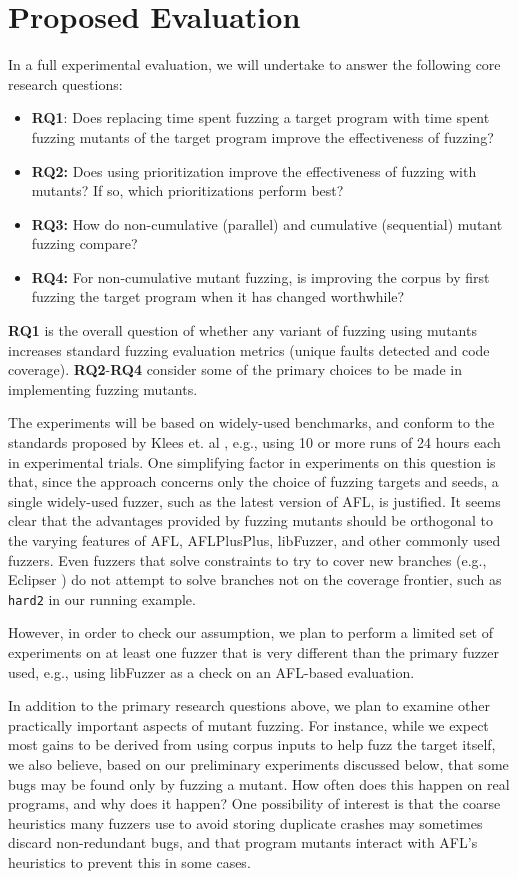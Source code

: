 \section{Proposed Evaluation}

In a full experimental evaluation, we will undertake to answer the following core research questions:

\begin{itemize}
  \item {\bf RQ1}: Does replacing time spent fuzzing a target program with time spent fuzzing mutants of the target program improve
  the effectiveness of fuzzing?
  \item {\bf RQ2:} Does using prioritization improve the effectiveness of fuzzing with mutants?  If so, which prioritizations perform best?
  \item {\bf RQ3:} How do non-cumulative (parallel) and cumulative (sequential) mutant fuzzing compare?
  \item {\bf RQ4:} For non-cumulative mutant fuzzing, is improving the corpus by first fuzzing the target program when it has changed worthwhile?
  \end{itemize}
  
{\bf RQ1} is the overall question of whether any variant of fuzzing using mutants increases standard fuzzing evaluation metrics
(unique faults detected and code coverage).  {\bf RQ2}-{\bf RQ4} consider some of the primary choices to be made in implementing fuzzing mutants.

The experiments will be based on widely-used benchmarks, and conform to the standards proposed by Klees et. al \cite{evalfuzz}, e.g., using 10 or
more runs of 24 hours each in experimental trials.  One simplifying factor in experiments on this question is that, since the approach concerns
only the choice of fuzzing targets and seeds, a single widely-used fuzzer, such as the latest version of AFL, is justified.  It seems clear that
the advantages provided by fuzzing mutants should be orthogonal to the varying features of AFL, AFLPlusPlus, libFuzzer, and other commonly
used fuzzers.  Even fuzzers that solve constraints to try to cover new branches (e.g., Eclipser \cite{eclipser}) do not attempt to solve branches not on the coverage frontier, such as {\tt hard2} in our running example.

However, in order to check our assumption, we plan to perform a limited set of experiments on at least one fuzzer that is very different than the primary fuzzer used, e.g., using libFuzzer as a check on an AFL-based evaluation.

In addition to the primary research questions above, we plan to
examine other practically important aspects of mutant fuzzing.  For
instance, while we expect most gains to be derived from using corpus
inputs to help fuzz the target itself, we also believe, based on our
preliminary experiments discussed below, that some bugs may be found
only by fuzzing a mutant.  How often does this happen on real
programs, and why does it happen?  One possibility of interest is that the coarse heuristics many fuzzers use to avoid storing duplicate crashes \cite{semantic-crash-bucketing,mdebug} may sometimes discard non-redundant bugs, and that program mutants interact with AFL's heuristics to prevent this in some cases.
